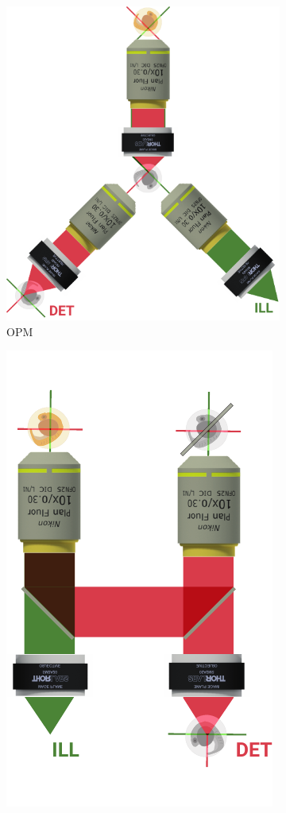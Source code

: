 \begin{figure}
  \centering
  \begin{subfigure}[t]{\textwidth}
    \centering
    \includegraphics{single_objectives/opm}
    \caption{\gls{OPM}~\cite{dunsby_optically_2008}}\label{fig:single_objectives/opm}
  \end{subfigure}
  \begin{subfigure}[t]{0.475\textwidth}
    \centering
    \includegraphics{single_objectives/atomic_mirror}

\end{subfigure}
\end{figure}
